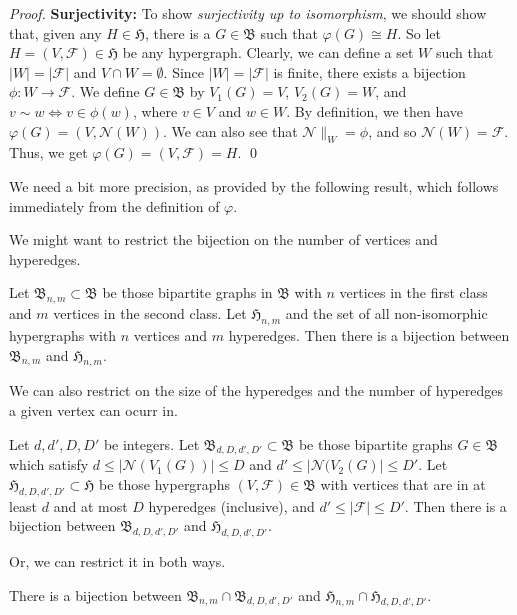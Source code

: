 \begin{proof}
\textbf{Surjectivity:}
To show \emph{surjectivity up to isomorphism}, we should show that, given any $H \in \mathfrak{H}$, there is a $G \in \mathfrak{B}$ such that $\varphi(G) \cong H$.
So let $H = (V, \mathcal{F}) \in \mathfrak{H}$ be any hypergraph.
Clearly, we can define a set $W$ such that $| W | = | \mathcal{F} |$ and $V \cap W = \emptyset$.
Since $| W | = | \mathcal{F} |$ is finite, there exists a bijection $\phi: W \rightarrow \mathcal{F}$.
We define $G \in \mathfrak{B}$ by $V_1(G) = V$, $V_2(G) = W$, and $v \sim w \Leftrightarrow v \in \phi(w)$, where $v \in V$ and $w \in W$.
By definition, we then have $\varphi(G) = (V, \mathcal{N}(W))$.
We can also see that $\mathcal{N} \|_{W} = \phi$, and so $\mathcal{N}(W) = \mathcal{F}$.
Thus, we get $\varphi(G) = (V, \mathcal{F}) = H$.
\qed
\end{proof}

We need a bit more precision, as provided by the following result, which follows immediately from the definition of $\varphi$.

We might want to restrict the bijection on the number of vertices and hyperedges.

\begin{corollary}
Let $\mathfrak{B}_{n,m} \subset \mathfrak{B}$ be those bipartite graphs in $\mathfrak{B}$ with $n$ vertices in the first class and $m$ vertices in the second class.
Let $\mathfrak{H}_{n,m}$ and the set of all non-isomorphic hypergraphs with $n$ vertices and $m$ hyperedges.
Then there is a bijection between $\mathfrak{B}_{n,m}$ and $\mathfrak{H}_{n,m}$.
\end{corollary}

We can also restrict on the size of the hyperedges and the number of hyperedges a given vertex can ocurr in.

\begin{corollary}
Let $d,d',D,D'$ be integers.
Let $\mathfrak{B}_{d,D,d',D'} \subset \mathfrak{B}$ be those bipartite graphs $G \in \mathfrak{B}$ which satisfy $d \leq | \mathcal{N}(V_1(G)) | \leq D$ and $d' \leq | \mathcal{N}(V_2(G) | \leq D'$.
Let $\mathfrak{H}_{d,D,d',D'} \subset \mathfrak{H}$ be those hypergraphs $(V, \mathcal{F}) \in \mathfrak{B}$ with vertices that are in at least $d$ and at most $D$ hyperedges (inclusive), and $d' \leq | \mathcal{F} | \leq D'$.
Then there is a bijection between $\mathfrak{B}_{d,D,d',D'}$ and $\mathfrak{H}_{d,D,d',D'}$.
\end{corollary}

Or, we can restrict it in both ways.

\begin{corollary}
\label{cor:hypergraph_bipartite_bijection}
There is a bijection between $\mathfrak{B}_{n,m} \cap \mathfrak{B}_{d,D,d',D'}$ and $\mathfrak{H}_{n,m} \cap \mathfrak{H}_{d,D,d',D'}$.
\end{corollary}
